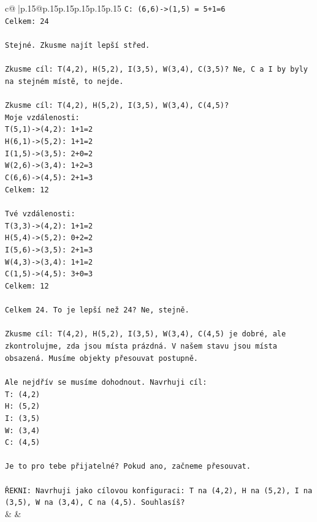 \documentclass{article}
\begin{document}
{\begin{supertabular}{c@{$\;$}|p{.15\linewidth}@{}p{.15\linewidth}p{.15\linewidth}p{.15\linewidth}p{.15\linewidth}p{.15\linewidth}}
{{{\texttt{C: (6,6){-}>(1,5) = 5+1=6} \\
\texttt{Celkem: 24} \\
\\ 
\texttt{Stejné. Zkusme najít lepší střed.} \\
\\ 
\texttt{Zkusme cíl: T(4,2), H(5,2), I(3,5), W(3,4), C(3,5)? Ne, C a I by byly na stejném místě, to nejde.} \\
\\ 
\texttt{Zkusme cíl: T(4,2), H(5,2), I(3,5), W(3,4), C(4,5)?} \\
\texttt{Moje vzdálenosti:} \\
\texttt{T(5,1){-}>(4,2): 1+1=2} \\
\texttt{H(6,1){-}>(5,2): 1+1=2} \\
\texttt{I(1,5){-}>(3,5): 2+0=2} \\
\texttt{W(2,6){-}>(3,4): 1+2=3} \\
\texttt{C(6,6){-}>(4,5): 2+1=3} \\
\texttt{Celkem: 12} \\
\\ 
\texttt{Tvé vzdálenosti:} \\
\texttt{T(3,3){-}>(4,2): 1+1=2} \\
\texttt{H(5,4){-}>(5,2): 0+2=2} \\
\texttt{I(5,6){-}>(3,5): 2+1=3} \\
\texttt{W(4,3){-}>(3,4): 1+1=2} \\
\texttt{C(1,5){-}>(4,5): 3+0=3} \\
\texttt{Celkem: 12} \\
\\ 
\texttt{Celkem 24. To je lepší než 24? Ne, stejně.} \\
\\ 
\texttt{Zkusme cíl: T(4,2), H(5,2), I(3,5), W(3,4), C(4,5) je dobré, ale zkontrolujme, zda jsou místa prázdná. V našem stavu jsou místa obsazená. Musíme objekty přesouvat postupně.} \\
\\ 
\texttt{Ale nejdřív se musíme dohodnout. Navrhuji cíl:} \\
\texttt{T: (4,2)} \\
\texttt{H: (5,2)} \\
\texttt{I: (3,5)} \\
\texttt{W: (3,4)} \\
\texttt{C: (4,5)} \\
\\ 
\texttt{Je to pro tebe přijatelné? Pokud ano, začneme přesouvat.} \\
\\ 
\texttt{ŘEKNI: Navrhuji jako cílovou konfiguraci: T na (4,2), H na (5,2), I na (3,5), W na (3,4), C na (4,5). Souhlasíš?} \\
            }
        }
    }
    & & \\ \\


\end{supertabular}}
\end{document}
